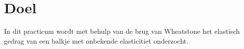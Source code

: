 
\section{Doel}

In dit practicum wordt met behulp van de brug van Wheatstone
het elastisch gedrag van een balkje met onbekende elasticitiet
onderzocht.
